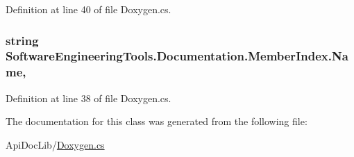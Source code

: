 Definition at line 40 of file Doxygen.\+cs.

\hypertarget{class_software_engineering_tools_1_1_documentation_1_1_member_index_a3c095e56c2e89f60e037a1a07dcf1932}{
\subsubsection[{Name}]{\setlength{\rightskip}{0pt plus 5cm}string Software\+Engineering\+Tools.\+Documentation.\+Member\+Index.\+Name\hspace{0.3cm}{\ttfamily [get]}, {\ttfamily [set]}}}\label{class_software_engineering_tools_1_1_documentation_1_1_member_index_a3c095e56c2e89f60e037a1a07dcf1932}


Definition at line 38 of file Doxygen.\+cs.



The documentation for this class was generated from the following file\+:\begin{DoxyCompactItemize}
\item 
Api\+Doc\+Lib/\hyperlink{_doxygen_8cs}{Doxygen.\+cs}\end{DoxyCompactItemize}
